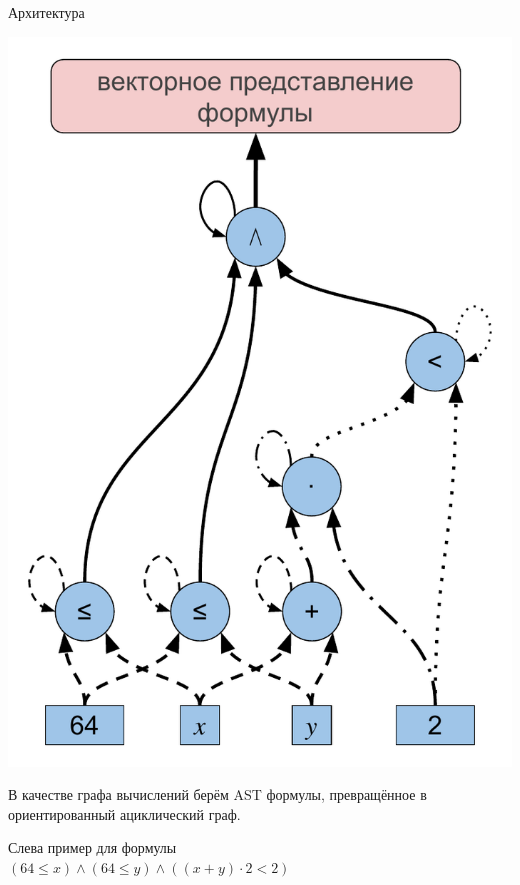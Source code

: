 \documentclass[14pt,aspectratio=169,hyperref={pdftex,unicode},xcolor=dvipsnames]{beamer}
\renewcommand{\le}{\leqslant}
\begin{document}
\begin{frame}{Архитектура}

\begin{minipage}{0.5\textwidth}

\begin{center}
  \includegraphics[scale=0.37]{./assets/formula-ast-talk.pdf}
\end{center}

\end{minipage}%
\begin{minipage}{0.5\textwidth}

В качестве графа вычислений берём AST формулы, превращённое в ориентированный ациклический граф.

\medskip

Слева пример для формулы \\ {\small $(64 \le x) \wedge (64 \le y) \wedge ((x + y) \cdot 2 < 2)$}

\end{minipage}

\end{frame}
\end{document}
